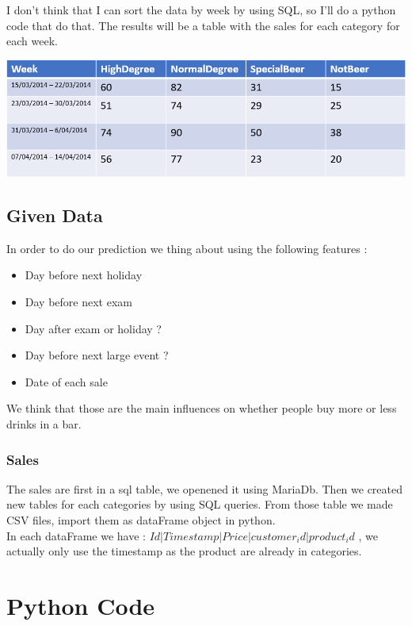 \documentclass{report}
\begin{document}
I don't think that I can sort the data by week by using SQL, so I'll do a python code that do that. The results will be a table with the sales for each category for each week.


\includegraphics{FormatTable}

\section{Given Data}

In order to do our prediction we thing about using the following features :
\begin{itemize}
\item Day before next holiday 
\item Day before next exam
\item Day after exam or holiday ?
\item Day before next large event ?
\item Date of each sale
\end{itemize}

We think that those are the main influences on whether people buy more or less drinks in a bar.

\subsection{Sales}

The sales are first in a sql table, we openened it using MariaDb. Then we created new tables for each categories by using SQL queries. From those table we made CSV files, import them as dataFrame object in python. \\
In each dataFrame we have : $Id | Timestamp | Price | customer_id | product_id$ , we actually only use the timestamp as the product are already in categories.


\section{}

\chapter{Python Code}
\end{document}
